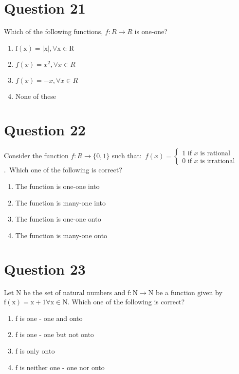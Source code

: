 \documentclass{article}
\begin{document}
\section*{Question 21}
Which of the following functions, \(f: R \rightarrow R\) is one-one?
\begin{enumerate}[label=(\alph*)]
\item \(\mathrm{f}(\mathrm{x})=|\mathrm{x}|, \forall \mathrm{x} \in \mathrm{R}\)
\item \(f(x)=x^{2}, \forall x \in R\)
\item \(f(x)=-x, \forall x \in R\)
\item None of these
\end{enumerate}
\newpage
\section*{Question 22}
Consider the function \(f: R \rightarrow\{0,1\}\) such that: \(f(x)=\left\{\begin{array}{c}1 \text { if } x \text { is rational } \\ 0 \text { if } x \text { is irrational }\end{array}\right.\). Which one of the following is correct?
\begin{enumerate}[label=(\alph*)]
\item The function is one-one into
\item The function is many-one into
\item The function is one-one onto
\item The function is many-one onto
\end{enumerate}
\newpage
\section*{Question 23}
Let \(\mathrm{N}\) be the set of natural numbers and \(\mathrm{f}: \mathrm{N} \rightarrow \mathrm{N}\) be a function given by \(\mathrm{f}(\mathrm{x})=\mathrm{x}+1 \forall \mathrm{x} \in \mathrm{N}\). Which one of the following is correct?\newline
\begin{enumerate}[label=(\alph*)]
\item f is one - one and onto\newline
\item f is one - one but not onto
\item f is only onto
\item f is neither one - one nor onto
\end{enumerate}
\newpage
\end{document}
